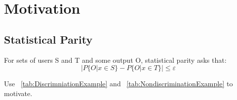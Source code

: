 \section{Motivation}
\label{sect:motivation}
%

\subsection{Statistical Parity}
For sets of users S and T and some output O, statistical parity asks that:
\begin{equation}
|P\{O | x \in S\} - P\{O | x \in T\}| \le \varepsilon
\label{eq:StatisticalParity}
\end{equation}

Use ~\ref{tab:DiscrimniationExample} and ~\ref{tab:NondiscriminationExample} to motivate.

